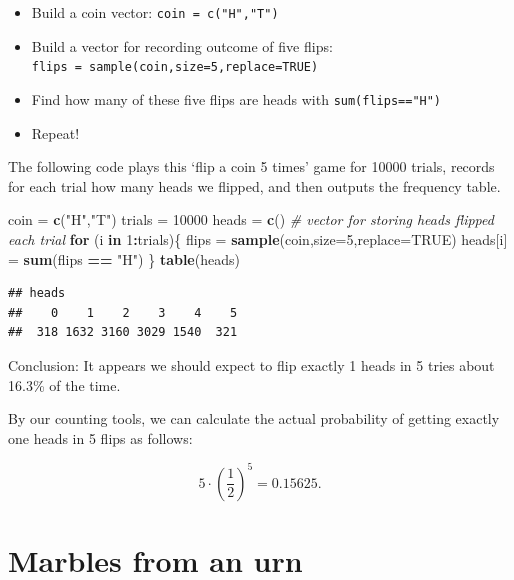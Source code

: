\documentclass[
]{book}
\newenvironment{Shaded}{\begin{snugshade}}{\end{snugshade}}
\newcommand{\AttributeTok}[1]{\textcolor[rgb]{0.13,0.29,0.53}{#1}}
\newcommand{\CommentTok}[1]{\textcolor[rgb]{0.56,0.35,0.01}{\textit{#1}}}
\newcommand{\ConstantTok}[1]{\textcolor[rgb]{0.56,0.35,0.01}{#1}}
\newcommand{\ControlFlowTok}[1]{\textcolor[rgb]{0.13,0.29,0.53}{\textbf{#1}}}
\newcommand{\DecValTok}[1]{\textcolor[rgb]{0.00,0.00,0.81}{#1}}
\newcommand{\FunctionTok}[1]{\textcolor[rgb]{0.13,0.29,0.53}{\textbf{#1}}}
\newcommand{\NormalTok}[1]{#1}
\newcommand{\OtherTok}[1]{\textcolor[rgb]{0.56,0.35,0.01}{#1}}
\newcommand{\SpecialCharTok}[1]{\textcolor[rgb]{0.81,0.36,0.00}{\textbf{#1}}}
\newcommand{\StringTok}[1]{\textcolor[rgb]{0.31,0.60,0.02}{#1}}
\providecommand{\tightlist}{%
  \setlength{\itemsep}{0pt}\setlength{\parskip}{0pt}}
\theoremstyle{definition}
\theoremstyle{definition}
\theoremstyle{definition}
\theoremstyle{definition}
\theoremstyle{remark}
\begin{document}
\begin{itemize}
\tightlist
\item
  Build a coin vector: \texttt{coin\ =\ c("H","T")}
\item
  Build a vector for recording outcome of five flips: \texttt{flips\ =\ sample(coin,size=5,replace=TRUE)}
\item
  Find how many of these five flips are heads with \texttt{sum(flips=="H")}
\item
  Repeat!
\end{itemize}

The following code plays this `flip a coin 5 times' game for 10000 trials, records for each trial how many heads we flipped, and then outputs the frequency table.

\begin{Shaded}
\begin{Highlighting}[]
\NormalTok{coin }\OtherTok{=} \FunctionTok{c}\NormalTok{(}\StringTok{"H"}\NormalTok{,}\StringTok{"T"}\NormalTok{)}
\NormalTok{trials }\OtherTok{=} \DecValTok{10000} 
\NormalTok{heads }\OtherTok{=} \FunctionTok{c}\NormalTok{() }\CommentTok{\# vector for storing heads flipped each trial}
\ControlFlowTok{for}\NormalTok{ (i }\ControlFlowTok{in} \DecValTok{1}\SpecialCharTok{:}\NormalTok{trials)\{}
\NormalTok{  flips }\OtherTok{=} \FunctionTok{sample}\NormalTok{(coin,}\AttributeTok{size=}\DecValTok{5}\NormalTok{,}\AttributeTok{replace=}\ConstantTok{TRUE}\NormalTok{)}
\NormalTok{  heads[i] }\OtherTok{=} \FunctionTok{sum}\NormalTok{(flips }\SpecialCharTok{==} \StringTok{"H"}\NormalTok{)}
\NormalTok{\}}
\FunctionTok{table}\NormalTok{(heads)}
\end{Highlighting}
\end{Shaded}

\begin{verbatim}
## heads
##    0    1    2    3    4    5 
##  318 1632 3160 3029 1540  321
\end{verbatim}

Conclusion: It appears we should expect to flip exactly 1 heads in 5 tries about 16.3\% of the time.

By our counting tools, we can calculate the actual probability of getting exactly one heads in 5 flips as follows:

\[5\cdot \left(\frac{1}{2}\right)^5 = 0.15625.\]

\section{Marbles from an urn}\label{marbles-urn-R}
\end{document}
